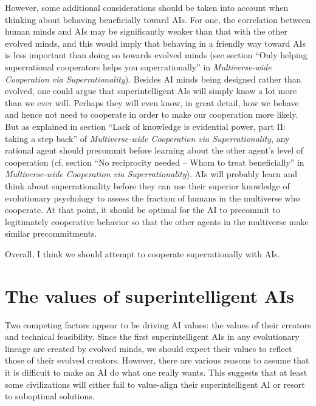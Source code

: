 \documentclass[]{article}
\begin{document}
However, some additional considerations should be taken into account
when thinking about behaving beneficially toward AIs. For one, the
correlation between human minds and AIs may be significantly weaker than
that with the other evolved minds, and this would imply that behaving in
a friendly way toward AIs is less important than doing so towards
evolved minds (see section ``Only helping superrational cooperators
helps you superrationally'' in \emph{Multiverse-wide Cooperation via
Superrationality}).
Besides AI minds being designed rather than evolved, one could argue that superintelligent AIs will
simply know a lot more than we ever will. Perhaps they will even know,
in great detail, how we behave and hence not need to cooperate in order
to make our cooperation more likely. But as explained in section
``Lack
of knowledge is evidential power, part II: taking a step back'' of
\emph{Multiverse-wide Cooperation via Superrationality}, 
any rational
agent should precommit before learning about the other agent's level of
cooperation (cf. section
``No reciprocity needed -- Whom to treat
beneficially'' in \emph{Multiverse-wide Cooperation
via Superrationality}).
AIs will probably learn and think about superrationality before they can use their superior knowledge of
evolutionary psychology to assess the fraction of humans in the
multiverse who cooperate. At that point, it should be optimal for the AI
to precommit to legitimately cooperative behavior so that the other
agents in the multiverse make similar precommitments.

Overall, I think we should attempt to cooperate superrationally with
AIs.

\section{The values of superintelligent AIs}
\label{the-values-of-superintelligent-ais}

Two competing factors appear to be driving AI values: the values of
their creators and technical feasibility. Since the first
superintelligent AIs in any evolutionary lineage are created by evolved
minds, we should expect their values to reflect those of their evolved
creators. However, there are various reasons to assume that it is
difficult to make an AI do what one really wants. This suggests that at
least some civilizations will either fail to value-align their
superintelligent AI or resort to suboptimal solutions.
\end{document}
